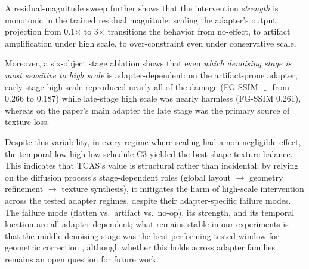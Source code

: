 \documentclass[times,twocolumn,final]{elsarticle}
\providecommand{\DIFadd}[1]{{\protect\color{blue} \sf #1}} %
\providecommand{\DIFaddbegin}{} %
\providecommand{\DIFaddend}{} %
\newcommand{\DIFaddincludegraphics}[2][]{{\color{blue}\fbox{\DIFOincludegraphics[#1]{#2}}}} %
\DeclareRobustCommand{\DIFaddbegin}{\DIFOaddbegin \let\includegraphics\DIFaddincludegraphics} %
\DeclareRobustCommand{\DIFaddend}{\DIFOaddend \let\includegraphics\DIFOincludegraphics} %
\begin{document}
A residual-magnitude sweep further shows that the intervention \emph{strength} is monotonic in the trained residual magnitude: scaling the adapter's output projection from 0.1$\times$ to 3$\times$ transitions the behavior from no-effect, to artifact amplification under high scale, to over-constraint even under conservative scale.

Moreover, a \DIFaddbegin \DIFadd{six-object }\DIFaddend stage ablation shows that even \emph{which denoising stage is most sensitive to high scale} is adapter-dependent: on the artifact-prone adapter, early-stage high scale reproduced nearly all of the damage (FG-SSIM $\downarrow$ from 0.266 to 0.187) while late-stage high scale was nearly harmless (FG-SSIM 0.261), whereas on the paper's main adapter the late stage was the primary source of texture loss.

Despite this variability, in every regime where scaling had a non-negligible effect, the temporal low-high-low schedule C3 yielded the best shape-texture balance. This indicates that TCAS's value is structural rather than incidental: by relying on the diffusion process's stage-dependent roles (global layout $\to$ geometry refinement $\to$ texture synthesis), it mitigates the harm of high-scale intervention   \DIFaddbegin \DIFadd{across the tested adapter regimes, despite their adapter-specific failure modes}\DIFaddend . The failure mode (flatten vs.\ artifact vs.\ no-op), its strength, and its temporal location are all adapter-dependent;   \DIFaddbegin \DIFadd{what remains stable in our experiments is that }\DIFaddend the middle denoising stage   \DIFaddbegin \DIFadd{was the best-performing tested }\DIFaddend window for geometric correction  \DIFaddbegin \DIFadd{, although whether this holds across adapter families remains an open question for future work.
}
\end{document}

